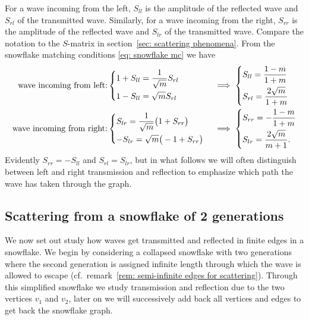 For a wave incoming from the left, $S_{ll}$ is the amplitude of the reflected wave and $S_{rl}$ of the transmitted wave. Similarly, for a wave incoming from the right, $S_{rr}$ is the amplitude of the reflected wave and $S_{lr}$ of the transmitted wave. Compare the notation to the $S$-matrix in section~\ref{sec: scattering phenomena}. From the snowflake matching conditions \eqref{eq: snowflake mc} we have
\begin{align*}
  \text{wave incoming from left:} & \begin{dcases}
    1 + S_{ll} = \frac{1}{\sqrt{m}} S_{rl} \\
    1 - S_{ll} = \sqrt{m} S_{rl}
  \end{dcases}
  && \implies \begin{dcases}
    S_{ll} = \frac{1-m}{1+m} \\
    S_{rl} = \frac{2\sqrt{m}}{1+m}
  \end{dcases}
  \\
  \text{wave incoming from right:} & \begin{dcases}
    S_{lr} = \frac{1}{\sqrt{m}} \big( 1 + S_{rr} \big) \\
    -S_{lr} = \sqrt{m} \big( - 1 + S_{rr} \big)
  \end{dcases}
  && \implies \begin{dcases}
    S_{rr} = -\frac{1-m}{1+m} \\
    S_{lr} = \frac{2\sqrt{m}}{m+1}.
  \end{dcases}
\end{align*}
Evidently $S_{rr} = - S_{ll}$ and $S_{rl} = S_{lr}$, but in what follows we will often distinguish between left and right transmission and reflection to emphasize which path the wave has taken through the graph.




\subsection{Scattering from a snowflake of 2 generations}\label{sec: scattering 2 gen snowflake}

We now set out study how waves get transmitted and reflected in finite edges in a snowflake. We begin by considering a collapsed snowflake with two generations where the second generation is assigned infinite length through which the wave is allowed to escape (cf.\ remark~\ref{rem: semi-infinite edges for scattering}). Through this simplified snowflake we study transmission and reflection due to the two vertices $v_1$ and $v_2$, later on we will successively add back all vertices and edges to get back the snowflake graph.


